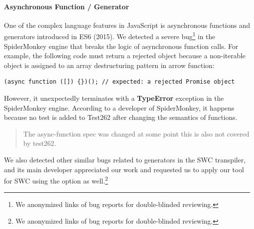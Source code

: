 
\paragraph{\textbf{Asynchronous Function / Generator}}
One of the complex language features in JavaScript is asynchronous functions and
generators introduced in ES6 (2015).
%
We detected a severe bug\footnote{
  We anonymized links of bug reports for double-blinded reviewing.
} in the SpiderMonkey engine that breaks the logic of asynchronous function
calls.
%
For example, the following code must return a rejected  object
because a non-iterable object \jscode{\{\}} is assigned to an array
destructuring pattern \jscode{[]} in  arrow function:
%
\begin{lstlisting}[style=JS, basicstyle=\footnotesize\ttfamily]
(async function ([]) {})(); // expected: a rejected Promise object
\end{lstlisting}
%
However, it unexpectedly terminates with a \textbf{TypeError} exception in 
the SpiderMonkey engine.
%
According to a developer of SpiderMonkey, it happens because no test is added to
Test262 after changing the semantics of  functions.
%
{
  \small
  \begin{quote}
    The async-function spec was changed at some point \textelp{}
    this is also not covered by test262.
  \end{quote}
}
%
\noindent
We also detected other similar bugs related to generators in the SWC transpiler,
and its main developer appreciated our work and requested us to apply our tool
for SWC using the  option as well.\footnote{
  We anonymized links of bug reports for double-blinded reviewing.
}


